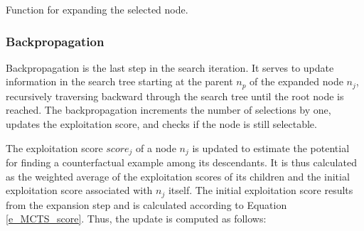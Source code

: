 {
\setlength{\algomargin}{1.25em}
\begin{algorithm}[ht]
\caption{Function for expanding the selected node.}
\small
\label{a_MCTS_Expand}
\end{algorithm}
}

\subsubsection{Backpropagation}
\label{s_Methodology_CoDy_Backpropagation}

Backpropagation is the last step in the search iteration. It serves to update information in the search tree starting at the parent $n_p$ of the expanded node $n_j$, recursively traversing backward through the search tree until the root node is reached. The backpropagation increments the number of selections by one, updates the exploitation score, and checks if the node is still selectable.

The exploitation score $score_j$ of a node $n_j$ is updated to estimate the potential for finding a counterfactual example among its descendants. It is thus calculated as the weighted average of the exploitation scores of its children and the initial exploitation score associated with $n_j$ itself. The initial exploitation score results from the expansion step and is calculated according to Equation \ref{e_MCTS_score}. Thus, the update is computed as follows:


